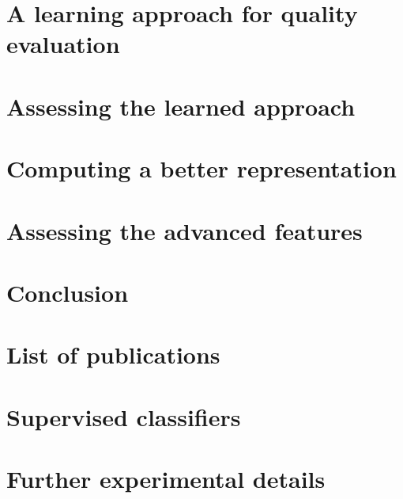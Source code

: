 \documentclass[12pt, twoside]{book}
\begin{document}
    \chapter{A learning approach for quality evaluation}
        \label{chap::learned_evaluation}
        

    \chapter{Assessing the learned approach}
        \label{chap::experiments}
        

    \chapter{Computing a better representation}
        \label{chap::better_representation}
        

    \chapter{Assessing the advanced features}
        \label{chap::advanced_experiments}
        

    \chapter{Conclusion}
        \label{chap::conclusion}
        

    \appendix
    \chapter{List of publications}
        \label{chap::publications}
        
    \chapter{Supervised classifiers}
        \label{chap::classifiers}
        
    \chapter{Further experimental details}
        \label{chap::details}
        
    

    \printglossary[type=\acronymtype]
    \printglossary
    
    \printbibliography[heading=bibintoc]
    \printindex

    
\end{document}
